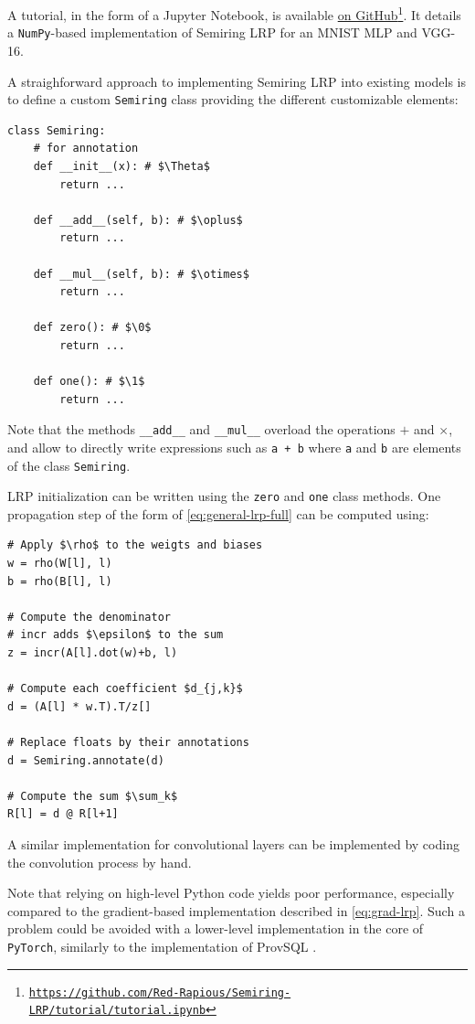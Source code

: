 \documentclass[twocolumn]{../cs-classes/cs-classes}
\newcommand*{\1}{\digitsbb{1}}
\newcommand*{\0}{\digitsbb{0}}
\begin{document}
A tutorial, in the form of a Jupyter Notebook, is available \href{https://github.com/Red-Rapious/Semiring-LRP/tutorial/tutorial.ipynb}{on GitHub}\footnote{\href{https://github.com/Red-Rapious/Semiring-LRP/tutorial/tutorial.ipynb}{\nolinkurl{https://github.com/Red-Rapious/Semiring-LRP/tutorial/tutorial.ipynb}}}. It details a \texttt{NumPy}-based implementation of Semiring LRP for an MNIST MLP and VGG-16.

A straighforward approach to implementing Semiring LRP into existing models is to define a custom \texttt{Semiring} class providing the different customizable elements:
\begin{verbatim}
class Semiring:
    # for annotation
    def __init__(x): # $\Theta$
        return ...

    def __add__(self, b): # $\oplus$
        return ...

    def __mul__(self, b): # $\otimes$
        return ...

    def zero(): # $\0$
        return ...

    def one(): # $\1$
        return ...
\end{verbatim}
Note that the methods \texttt{__add__} and \texttt{__mul__} overload the operations $+$ and $\times$, and allow to directly write expressions such as \texttt{a + b} where \texttt{a} and \texttt{b} are elements of the class \texttt{Semiring}.

LRP initialization can be written using the \texttt{zero} and \texttt{one} class methods. One propagation step of the form of \autoref{eq:general-lrp-full} can be computed using:
\begin{verbatim}
# Apply $\rho$ to the weigts and biases
w = rho(W[l], l)
b = rho(B[l], l)

# Compute the denominator
# incr adds $\epsilon$ to the sum
z = incr(A[l].dot(w)+b, l)

# Compute each coefficient $d_{j,k}$
d = (A[l] * w.T).T/z[] 

# Replace floats by their annotations
d = Semiring.annotate(d)

# Compute the sum $\sum_k$
R[l] = d @ R[l+1]
\end{verbatim}

A similar implementation for convolutional layers can be implemented by coding the convolution process by hand.

Note that relying on high-level Python code yields poor performance, especially compared to the gradient-based implementation described in \autoref{eq:grad-lrp}. Such a problem could be avoided with a lower-level implementation in the core of \texttt{PyTorch}, similarly to the implementation of ProvSQL \cite{provsql}.
\end{document}
